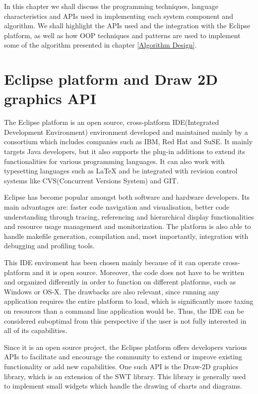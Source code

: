 \label{implem}
In this chapter we shall discuss the programming techniques, language characteristics and APIs
used in implementing each system component and algorithm. We shall highlight the APIs used and the 
integration with the Eclipse platform, as well as how OOP techniques and patterns are used to implement 
some of the algorithm presented in chapter \ref{Algorithm Design}.

\section{Eclipse platform and Draw 2D graphics API}

The Eclipse platform is an open source, cross-platform IDE(Integrated Development Environment) environment 
developed and maintained mainly by a consortium which includes companies such as IBM, Red Hat and SuSE. 
It mainly targets Java developers, but it also supports the plug-in additions to extend its functionalities 
for various programming languages. It can also work with typesetting languages such as LaTeX and be integrated 
with revision control systems like CVS(Concurrent Versions System) and GIT.

Eclipse has become popular amongst both software and hardware developers. Its main advantages are: faster 
code navigation and visualisation, better code understanding through tracing, referencing and hierarchical 
display functionalities and resource usage management and monitorization. The platform is also able to 
handle makefile generation, compilation and, most importantly, integration with debugging and profiling tools.

This IDE enviroment has been chosen mainly because of it can operate cross-platform and it is open source. 
Moreover, the code does not have to be written and organized differently in order to function on different 
platforms, such as Windows or OS-X. The drawbacks are also relevant, since running any application requires 
the entire platform to load, which is significantly more taxing on resources than a command line application 
would be. Thus, the IDE can be considered suboptimal from this perspective if the user is not fully interested 
in all of its capabilities.

Since it is an open source project, the Eclipse platform offers developers various APIs to facilitate and 
encourage the community to extend or improve existing functionality or add new capabilities. One such 
API is the Draw-2D graphics library, which is an extension of the SWT library. This library is generally used 
to implement small widgets which handle the drawing of charts and diagrams.

